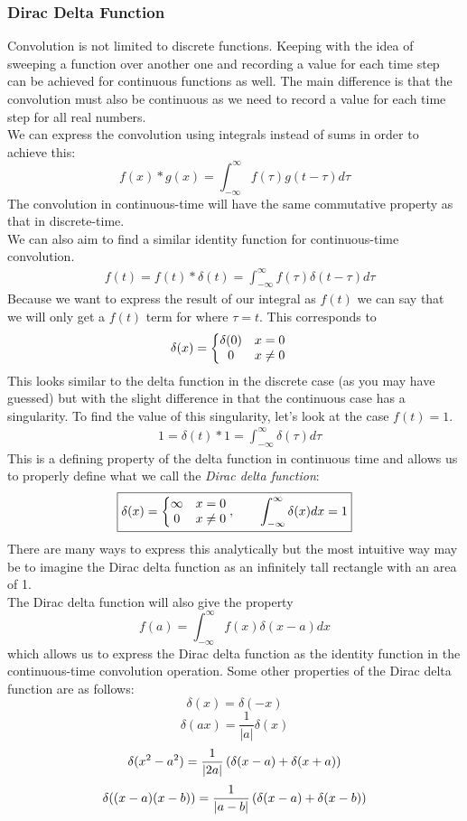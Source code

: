 \documentclass[11pt, fleqn]{article}
\begin{document}
\subsubsection{Dirac Delta Function}
Convolution is not limited to discrete functions. Keeping with the idea of sweeping a function over another one and recording a value for each time step can be achieved for continuous functions as well. The main difference is that the convolution must also be continuous as we need to record a value for each time step for all real numbers.\\
We can express the convolution using integrals instead of sums in order to achieve this:
$$\boxed{f(x)*g(x)=\int_{-\infty}^\infty f(\tau)g(t-\tau)d\tau}$$
The convolution in continuous-time will have the same commutative property as that in discrete-time.\\
We can also aim to find a similar identity function for continuous-time convolution.
\begin{align*}
    &f(t)=f(t)*\delta(t)=\int_{-\infty}^\infty f(\tau)\delta(t-\tau)d\tau
\end{align*}
Because we want to express the result of our integral as $f(t)$ we can say that we will only get a $f(t)$ term for where $\tau=t$. This corresponds to
\begin{align*}
    &\delta(x)=\left\{\begin{matrix} \delta(0) & x=0\\ 0 & x\neq 0 \end{matrix}\right.
\end{align*}
This looks similar to the delta function in the discrete case (as you may have guessed) but with the slight difference in that the continuous case has a singularity. To find the value of this singularity, let's look at the case $f(t)=1$.
\begin{align*}
    &1=\delta(t)*1=\int_{-\infty}^\infty\delta(\tau)d\tau
\end{align*}
This is a defining property of the delta function in continuous time and allows us to properly define what we call the \textit{Dirac delta function}:
$$\boxed{\delta(x)=\left\{\begin{matrix} \infty & x=0\\ 0 & x\neq 0 \end{matrix}\right.,\quad\quad \int_{-\infty}^\infty \delta(x)dx=1}$$
There are many ways to express this analytically but the most intuitive way may be to imagine the Dirac delta function as an infinitely tall rectangle with an area of 1.\\
The Dirac delta function will also give the property
$$\boxed{f(a)=\int_{-\infty}^\infty f(x)\delta(x-a)dx}$$
which allows us to express the Dirac delta function as the identity function in the continuous-time convolution operation.
Some other properties of the Dirac delta function are as follows:
$$\delta(x)=\delta(-x)$$
$$\delta(ax)=\frac{1}{|a|}\delta(x)$$
$$\delta(x^2-a^2)=\frac{1}{|2a|}\left( \delta(x-a)+\delta(x+a) \right)$$
$$\delta((x-a)(x-b))=\frac{1}{|a-b|}\left( \delta(x-a)+\delta(x-b) \right)$$
\end{document}
